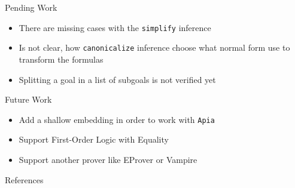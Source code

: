\documentclass[xetex, hyperref={pdfpagelabels=false}]{beamer}
\begin{document}
\begin{frame}[label=pending-work]{Pending Work}
\begin{itemize}
\item There are missing cases with the \texttt{simplify} inference
\item Is not clear, how  \texttt{canonicalize} inference choose what
normal form use to transform the formulas
\item Splitting a goal in a list of subgoals is not verified yet
\end{itemize}
\end{frame}

\begin{frame}[label=future-work]{Future Work}
\begin{itemize}
  \item Add a shallow embedding in order to work with \texttt{Apia}
  \item Support First-Order Logic with Equality
  \item Support another prover like EProver or Vampire
\end{itemize}
\end{frame}


\begin{frame}[label=references]{References}
\printbibliography
\end{frame}
\end{document}
